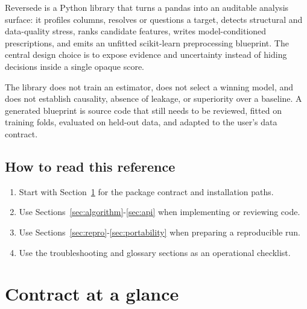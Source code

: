 \documentclass[10pt,a4paper,oneside]{article}
\newcommand{\code}[1]{\texttt{\small\detokenize{#1}}}
\begin{document}
Reversede is a Python library that turns a pandas \code{DataFrame} into an auditable analysis
surface: it profiles columns, resolves or questions a target, detects structural and data-quality
stress, ranks candidate features, writes model-conditioned prescriptions, and emits an unfitted
scikit-learn preprocessing blueprint. The central design choice is to expose evidence and uncertainty
instead of hiding decisions inside a single opaque score.

The library does not train an estimator, does not select a winning model, and does not establish
causality, absence of leakage, or superiority over a baseline. A generated blueprint is source code
that still needs to be reviewed, fitted on training folds, evaluated on held-out data, and adapted to
the user's data contract.

\subsection{How to read this reference}
\begin{enumerate}
  \item Start with Section~\ref{sec:contract} for the package contract and installation paths.
  \item Use Sections~\ref{sec:algorithm}-\ref{sec:api} when implementing or reviewing code.
  \item Use Sections~\ref{sec:repro}-\ref{sec:portability} when preparing a reproducible run.
  \item Use the troubleshooting and glossary sections as an operational checklist.
\end{enumerate}

\section{Contract at a glance}\label{sec:contract}
\end{document}
